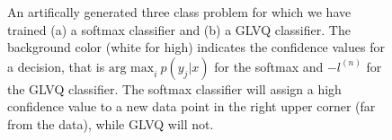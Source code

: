\documentclass{esannV2}
\begin{document}
\begin{figure}[t]
\caption{An artifically generated three class problem for which we have trained (a) a softmax classifier and (b) a GLVQ classifier. The background color (white for high) indicates the confidence values for a decision, that is $\mbox{arg max}_i\ p(y_j|x)$ for the softmax and $-l^{(n)}$ for the GLVQ classifier\protect\footnotemark. The softmax classifier will assign a high confidence value to a new data point in the right upper corner (far from the data), while GLVQ will not. }
\label{figure:diff_glvq_softmax}
\end{figure}
\end{document}
